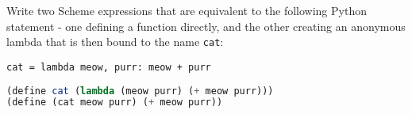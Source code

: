 \question Write two Scheme expressions that are equivalent to the
following Python statement - one defining a function directly, and the other creating an anonymous lambda
that is then bound to the name \texttt{cat}:

\begin{lstlisting}
cat = lambda meow, purr: meow + purr
\end{lstlisting}
\begin{solution}
\begin{lstlisting}[language=Scheme]
(define cat (lambda (meow purr) (+ meow purr)))
(define (cat meow purr) (+ meow purr))
\end{lstlisting}
\end{solution}
